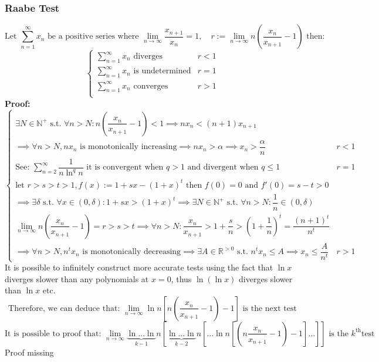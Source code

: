 \documentclass{article}
\newcommand{\st}{\mbox{ s.t. }}
\newcommand{\0}{{\bf{0}}}
\begin{document}
\subsubsection{Raabe Test}
$$\mbox{Let }\sum_{n=1}^\infty x_n\mbox{ be a positive series where }\lim_{n\to\infty}\frac{x_{n+1}}{x_n}=1,\quad r:=\lim_{n\to\infty}n\left(\frac{x_n}{x_{n+1}}-1\right)\mbox{ then:}$$
$$\begin{cases}
    \sum\limits_{n=1}^\infty x_n \mbox{ diverges}&r<1\\
    \sum\limits_{n=1}^\infty x_n \mbox{ is undetermined}&r=1\\
    \sum\limits_{n=1}^\infty x_n \mbox{ converges}&r>1\\
\end{cases}$$
\textbf{Proof:}
$$\begin{cases}
    \exists N\in\mathbb{N}^+\st\forall n>N:n\left(\dfrac{x_n}{x_{n+1}}-1\right)<1\implies nx_n<(n+1)x_{n+1}\\
    \implies\forall n>N,nx_n\mbox{ is monotonically increasing}\implies nx_n>\alpha\implies x_n>\dfrac{\alpha}{n}&r<1\\
    \mbox{See: }\sum\limits_{n=2}^\infty\dfrac{1}{n\ln^qn}\mbox{ it is convergent when $q>1$ and divergent when $q\le1$}&r=1\\
    \mbox{let }r>s>t>1,f(x):=1+sx-(1+x)^t\mbox{ then }f(0)=0\mbox{ and }f'(0)=s-t>0\\
    \implies\exists\delta\mbox{ s.t. }\forall x\in(0,\delta):1+sx>(1+x)^t\implies\exists N\in\mathbb{N}^+\mbox{ s.t. }\forall n>N:\dfrac{1}{n}\in(0,\delta)\\
    \lim\limits_{n\to\infty}n\left(\dfrac{x_n}{x_{n+1}}-1\right)=r>s>t\implies\forall n>N:\dfrac{x_n}{x_{n+1}}>1+\dfrac{s}{n}>\left(1+\dfrac{1}{n}\right)^t=\dfrac{(n+1)^t}{n^t}\\
    \implies\forall n>N,n^tx_n\mbox{ is monotonically decreasing}\implies\exists A\in\mathbb{R}^{>0}\mbox{ s.t. }n^tx_n\le A\implies x_n\le\dfrac{A}{n^t}&r>1
\end{cases}$$
It is possible to infinitely construct more accurate tests using the fact that $\ln x$ diverges slower than any polynomials at $x=0$, thus $\ln(\ln x)$ diverges slower than $\ln x$ etc.
$$\mbox{Therefore, we can deduce that: }\lim_{n\to\infty}\ln n\left[n\left(\frac{x_n}{x_{n+1}}-1\right)-1\right]\mbox{ is the next test}$$
$$\mbox{It is possible to proof that: }\lim_{n\to\infty}\underbrace{\ln\dots\ln}_{k-1}n\left[\underbrace{\ln\dots\ln}_{k-2}n\left[\dots\ln n\left[\left(n\frac{x_n}{x_{n+1}}-1\right)-1\right]\dots\right]\right]\mbox{ is the }k^{\mbox{th}}\mbox{test}$$
\null\hfill{Proof missing}
\end{document}
